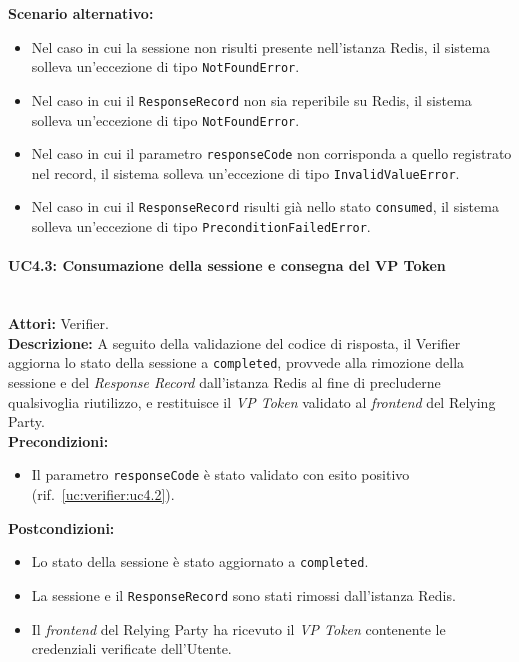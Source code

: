 \noindent\textbf{Scenario alternativo:}
\begin{itemize}
    \item Nel caso in cui la sessione non risulti presente nell'istanza Redis, il sistema solleva un'eccezione di tipo \texttt{NotFoundError}.
    \item Nel caso in cui il \texttt{ResponseRecord} non sia reperibile su Redis, il sistema solleva un'eccezione di tipo \texttt{NotFoundError}.
    \item Nel caso in cui il parametro \texttt{responseCode} non corrisponda a quello registrato nel record, il sistema solleva un'eccezione di tipo \texttt{InvalidValueError}.
    \item Nel caso in cui il \texttt{ResponseRecord} risulti già nello stato \texttt{consumed}, il sistema solleva un'eccezione di tipo \texttt{PreconditionFailedError}.
\end{itemize}

\paragraph{\large\bfseries UC4.3: Consumazione della sessione e consegna del VP Token}
\label{uc:verifier:uc4.3}
\mbox{}\\
\noindent\textbf{Attori:} Verifier.
\\
\noindent\textbf{Descrizione:} A seguito della validazione del codice di risposta, il Verifier aggiorna lo stato della sessione a \texttt{completed}, provvede alla rimozione della sessione e del \textit{Response Record} dall'istanza Redis al fine di precluderne qualsivoglia riutilizzo, e restituisce il \textit{VP Token} validato al \textit{frontend} del Relying Party.
\\
\noindent\textbf{Precondizioni:}
\begin{itemize}
    \item Il parametro \texttt{responseCode} è stato validato con esito positivo (rif.\ \ref{uc:verifier:uc4.2}).
\end{itemize}
\noindent\textbf{Postcondizioni:}
\begin{itemize}
    \item Lo stato della sessione è stato aggiornato a \texttt{completed}.
    \item La sessione e il \texttt{ResponseRecord} sono stati rimossi dall'istanza Redis.
    \item Il \textit{frontend} del Relying Party ha ricevuto il \textit{VP Token} contenente le credenziali verificate dell'Utente.
\end{itemize}

